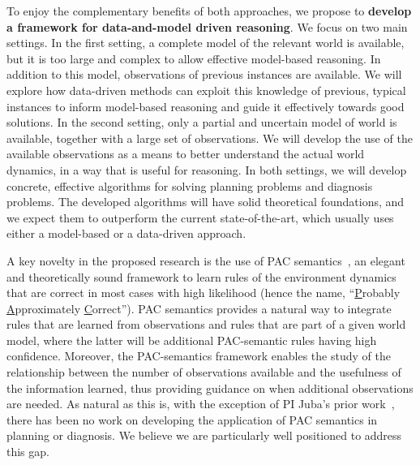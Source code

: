 \documentclass[12pt]{article}
\begin{document}
To enjoy the complementary benefits of both approaches, 
we propose to {\bf develop a framework for data-and-model driven reasoning}. We focus on two main settings. 
In the first setting, a complete model of the relevant world is available, 
but it is too large and complex to allow effective model-based reasoning. 
In addition to this model, observations of previous instances
are available. We will explore how data-driven methods can exploit this knowledge of previous, typical instances to inform model-based reasoning and guide it effectively towards good solutions. 
In the second setting, only a partial and uncertain model of world is available, together with a large set of observations.  We will develop the use of the available observations as a means to better understand the actual world dynamics, in a way that is useful for reasoning.
In both settings, we will develop concrete, effective algorithms for solving planning problems and diagnosis problems. The developed algorithms will have solid theoretical foundations, and we expect them to outperform the current state-of-the-art, which usually uses either a model-based or a data-driven approach. 


A key novelty in the proposed research is the use of PAC semantics~\cite{valiant2000robustLogics}, 
an elegant and theoretically sound framework to learn rules of the environment dynamics that are correct in most cases with high likelihood (hence the name, ``{\underline P}robably {\underline A}pproximately {\underline C}orrect''). PAC semantics provides a natural way to integrate rules that are learned from observations and rules that are part of a given world model, where the latter will be additional PAC-semantic rules having high confidence. Moreover, the PAC-semantics framework enables the study of the relationship between the number of observations available and the usefulness of the information learned, thus providing guidance on when additional observations are needed. 
As natural as this is, with the exception of PI Juba's prior work~\cite{juba2016jmlr,juba2016aaai,zhang2017aaai}, there has been no work on developing the application of PAC semantics in planning or diagnosis. 
We believe we are particularly well positioned to address this gap.
\end{document}
